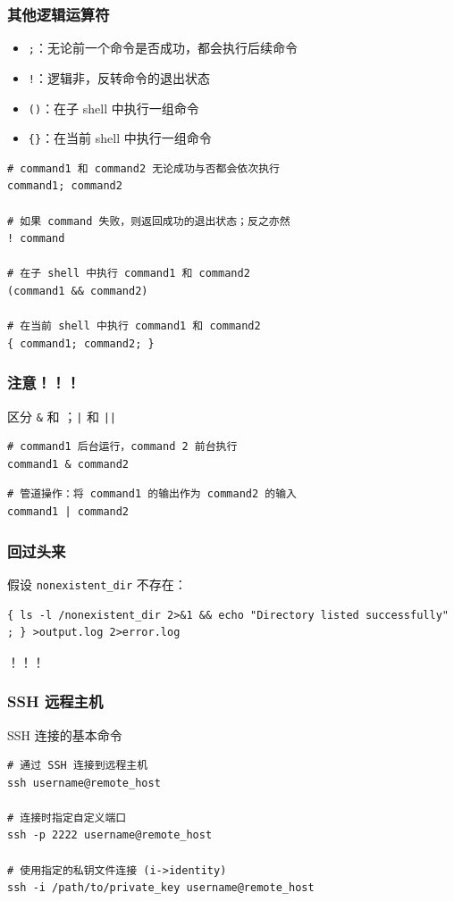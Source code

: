 \documentclass[UTF8, 16pt]{beamer}
\begin{document}
\begin{frame}[fragile]
    \frametitle{其他逻辑运算符}

    \begin{itemize}
        \item \texttt{;}：无论前一个命令是否成功，都会执行后续命令
        \item \texttt{!}：逻辑非，反转命令的退出状态
        \item \texttt{()}：在子 shell 中执行一组命令
        \item \texttt{\{\}}：在当前 shell 中执行一组命令
    \end{itemize}

    \begin{lstlisting}
# command1 和 command2 无论成功与否都会依次执行
command1; command2

# 如果 command 失败，则返回成功的退出状态；反之亦然
! command

# 在子 shell 中执行 command1 和 command2
(command1 && command2)

# 在当前 shell 中执行 command1 和 command2
{ command1; command2; }\end{lstlisting}
\end{frame}

\begin{frame}[fragile]
    \frametitle{注意！！！}
    \textcolor{sufered}{区分 \texttt{\&} 和 \text{\&\&}；\texttt{|} 和 \texttt{||}}

    \begin{lstlisting}
# command1 后台运行，command 2 前台执行
command1 & command2\end{lstlisting}
    \begin{lstlisting}
# 管道操作：将 command1 的输出作为 command2 的输入
command1 | command2\end{lstlisting}
\end{frame}

\begin{frame}[fragile]
    \frametitle{回过头来}
    \textcolor{sufered}{假设 \texttt{nonexistent\_dir} 不存在：}

    \begin{lstlisting}[numbers=none]
{ ls -l /nonexistent_dir 2>&1 && echo "Directory listed successfully" ; } >output.log 2>error.log\end{lstlisting}

    ！！！
\end{frame}

\begin{frame}[fragile]
    \frametitle{SSH 远程主机}
    \textcolor{sufered}{SSH 连接的基本命令}

    \begin{lstlisting}
# 通过 SSH 连接到远程主机
ssh username@remote_host

# 连接时指定自定义端口
ssh -p 2222 username@remote_host

# 使用指定的私钥文件连接 (i->identity)
ssh -i /path/to/private_key username@remote_host
    \end{lstlisting}
\end{frame}
\end{document}
